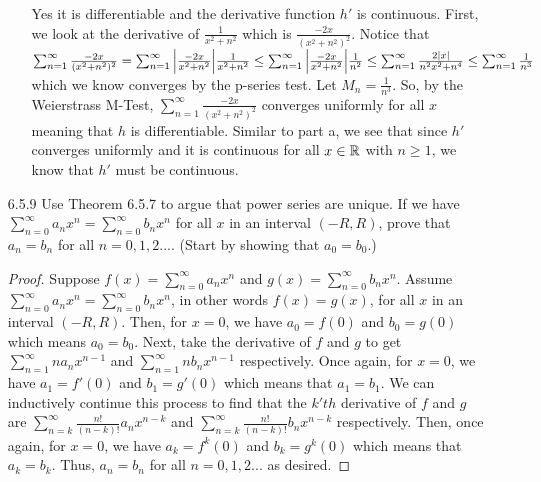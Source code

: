 \documentclass[12pt,letterpaper]{article}
\begin{document}
\begin{itemize}[leftmargin=!,labelindent=5pt]
\begin{itemize}
                    Yes it is differentiable and the derivative function $h'$ is continuous.
                    First, we look at the derivative of $\frac{1}{x^2 + n^2}$ which is $\frac{-2x}{(x^2 + n^2)^2}$.
                    Notice that $\sum_{n=1}^\infty \frac{-2x}{(x^2 + n^2)^2} = \sum_{n=1}^\infty \abs{\frac{-2x}{x^2 + n^2}} \frac{1}{x^2 + n^2} \leq \sum_{n=1}^\infty \abs{\frac{-2x}{x^2 + n^2}} \frac{1}{n^2} \leq \sum_{n=1}^\infty \frac{2\abs{x}}{n^2 x^2 + n^4} \leq \sum_{n=1}^\infty \frac{1}{n^3}$ which we know converges by the p-series test. 
                    Let $M_n = \frac{1}{n^3}$.
                    So, by the Weierstrass M-Test, $\sum_{n=1}^\infty \frac{-2x}{(x^2 + n^2)^2}$ converges uniformly for all $x$ meaning that $h$ is differentiable.
                    Similar to part a, we see that since $h'$ converges uniformly and it is continuous for all $x \in \mathbb{R}$ with $n \geq 1$, we know that $h'$ must be continuous.

            \end{itemize}
        \item [6.5.9] Use Theorem 6.5.7 to argue that power series are unique. If we have $\sum_{n=0}^{\infty} a_n x^n = \sum_{n=0}^{\infty} b_n x^n$ for all $x$ in an interval $(-R, R)$, prove that $a_n = b_n$ for all $n = 0,1,2 ... $. (Start by showing that $a_0 = b_0$.)
            \begin{proof}
                Suppose $f(x) = \sum_{n=0}^{\infty} a_n x^n$ and $g(x) = \sum_{n=0}^{\infty} b_n x^n$.
                Assume $\sum_{n=0}^{\infty} a_n x^n = \sum_{n=0}^{\infty} b_n x^n$, in other words $f(x) = g(x)$, for all $x$ in an interval $(-R, R)$.
                Then, for $x = 0$, we have $a_0 = f(0)$ and $b_0 = g(0)$ which means $a_0 = b_0$.
                Next, take the derivative of $f$ and $g$ to get $\sum_{n=1}^{\infty} na_n x^{n-1}$ and $\sum_{n=1}^{\infty} nb_n x^{n-1}$ respectively.
                Once again, for $x=0$, we have $a_1 = f'(0)$ and $b_1 = g'(0)$ which means that $a_1 = b_1$.
                We can inductively continue this process to find that the $k'th$ derivative of $f$ and $g$ are $\sum_{n=k}^\infty \frac{n!}{(n-k)!}a_n x^{n-k}$ and $\sum_{n=k}^\infty \frac{n!}{(n-k)!}b_n x^{n-k}$ respectively.
                Then, once again, for $x=0$, we have $a_k = f^k(0)$ and $b_k = g^k(0)$ which means that $a_k = b_k$.
                Thus, $a_n = b_n$ for all $n = 0,1,2 ... $ as desired.
            \end{proof}
    \end{itemize}
\end{document}
